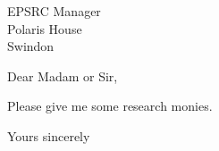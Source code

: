 \documentclass[
  fromemail,          %
  fromphone,          %
  foldmarks=false,    %
]{bristol-cs-letter}
\begin{document}

\begin{letter}{
  EPSRC Manager\\
  Polaris House\\
  Swindon
}


\opening{Dear Madam or Sir,}

Please give me some research monies.

\lipsum[1-5]

\closing{Yours sincerely} %



\end{letter}
\end{document}
